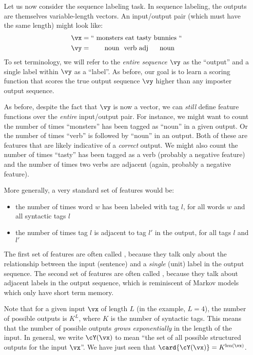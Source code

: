 Let us now consider the sequence labeling task.
In sequence labeling, the outputs are themselves variable-length vectors.
An input/output pair (which must have the same length) might look like:
\begin{align}
  \vx &= \text{`` monsters eat tasty bunnies ``} \\
  \vy &= \text{~~~~~~noun~~verb~adj~~~~~noun}
\end{align}
To set terminology, we will refer to the \emph{entire sequence} $\vy$ as the ``output'' and a single label within $\vy$ as a ``label''.
As before, our goal is to learn a scoring function that scores the true output sequence $\vy$ higher than any imposter output sequence.

As before, despite the fact that $\vy$ is now a vector, we can \emph{still} define feature functions over the \emph{entire} input/output pair.
For instance, we might want to count the number of times ``monsters'' has been tagged as ``noun'' in a given output.
Or the number of times ``verb'' is followed by ``noun'' in an output.
Both of these are features that are likely indicative of a \emph{correct} output.
We might also count the number of times ``tasty'' has been tagged as a verb (probably a negative feature) and the number of times two verbs are adjacent (again, probably a negative feature).

More generally, a very standard set of features would be:
\begin{itemize}
\item the number of times word $w$ has been labeled with tag $l$, for all words $w$ and all syntactic tags $l$
\item the number of times tag $l$ is adjacent to tag $l'$ in the output, for all tags $l$ and $l'$
\end{itemize}
The first set of features are often called , because they talk only about the relationship between the input (sentence) and a \emph{single} (unit) label in the output sequence.
The second set of features are often called , because they talk about adjacent labels in the output sequence, which is reminiscent of Markov models which only have short term memory.

Note that for a given input $\vx$ of length $L$ (in the example, $L=4$), the number of possible outputs is $K^L$, where $K$ is the number of syntactic tags.
This means that the number of possible outputs \emph{grows exponentially} in the length of the input.
In general, we write $\cY(\vx)$ to mean ``the set of all possible structured outputs for the input $\vx$''.
We have just seen that $\card{\cY(\vx)} = K^{\text{len}(\vx)}$.


